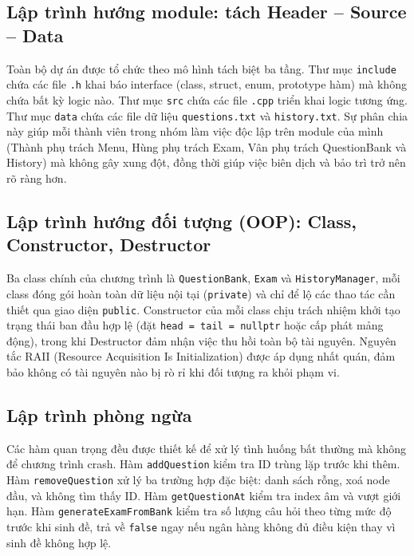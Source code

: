 \documentclass[11pt]{report}
\begin{document}
\subsection{Lập trình hướng module: tách Header -- Source -- Data}

Toàn bộ dự án được tổ chức theo mô hình tách biệt ba tầng. Thư mục \texttt{include} chứa các file \texttt{.h} khai báo interface (class, struct, enum, prototype hàm) mà không chứa bất kỳ logic nào. Thư mục \texttt{src} chứa các file \texttt{.cpp} triển khai logic tương ứng. Thư mục \texttt{data} chứa các file dữ liệu \texttt{questions.txt} và \texttt{history.txt}. Sự phân chia này giúp mỗi thành viên trong nhóm làm việc độc lập trên module của mình (Thành phụ trách Menu, Hùng phụ trách Exam, Vân phụ trách QuestionBank và History) mà không gây xung đột, đồng thời giúp việc biên dịch và bảo trì trở nên rõ ràng hơn.

\subsection{Lập trình hướng đối tượng (OOP): Class, Constructor, Destructor}

Ba class chính của chương trình là \texttt{QuestionBank}, \texttt{Exam} và \texttt{HistoryManager}, mỗi class đóng gói hoàn toàn dữ liệu nội tại (\texttt{private}) và chỉ để lộ các thao tác cần thiết qua giao diện \texttt{public}. Constructor của mỗi class chịu trách nhiệm khởi tạo trạng thái ban đầu hợp lệ (đặt \texttt{head = tail = nullptr} hoặc cấp phát mảng động), trong khi Destructor đảm nhận việc thu hồi toàn bộ tài nguyên. Nguyên tắc RAII (Resource Acquisition Is Initialization) được áp dụng nhất quán, đảm bảo không có tài nguyên nào bị rò rỉ khi đối tượng ra khỏi phạm vi.

\subsection{Lập trình phòng ngừa}

Các hàm quan trọng đều được thiết kế để xử lý tình huống bất thường mà không để chương trình crash. Hàm \texttt{addQuestion} kiểm tra ID trùng lặp trước khi thêm. Hàm \texttt{removeQuestion} xử lý ba trường hợp đặc biệt: danh sách rỗng, xoá node đầu, và không tìm thấy ID. Hàm \texttt{getQuestionAt} kiểm tra index âm và vượt giới hạn. Hàm \texttt{generateExamFromBank} kiểm tra số lượng câu hỏi theo từng mức độ trước khi sinh đề, trả về \texttt{false} ngay nếu ngân hàng không đủ điều kiện thay vì sinh đề không hợp lệ.
\end{document}
